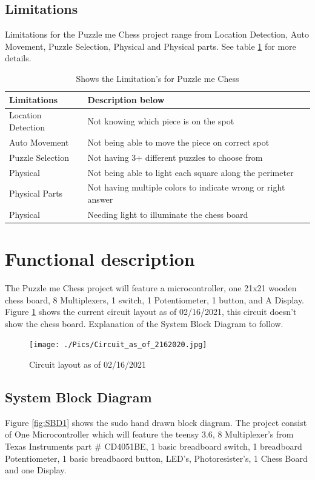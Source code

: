 \documentclass[11pt]{article}
\begin{document}
 
\subsection{Limitations}
Limitations for the Puzzle me Chess project range from Location Detection, Auto Movement, Puzzle Selection, Physical and Physical parts. See table \ref{tab:limitations} for more details.

\begin{table}
\begin{center}
    \begin{tabular}{| l | l |}
    \hline
    Limitations  & Description below\\ \hline
    Location Detection & Not knowing which piece is on the spot \\ \hline
    Auto Movement & Not being able to move the piece on correct spot \\ \hline 
    Puzzle Selection & Not having 3+ different puzzles to choose from  \\ \hline
    Physical & Not being able to light each square along the perimeter  \\ \hline
    Physical Parts & Not having multiple colors to indicate wrong or right answer \\ \hline
    Physical & Needing light to illuminate  the chess board \\ \hline
    \end{tabular}
    \caption{Shows the Limitation's for Puzzle me Chess}
	\label{tab:limitations}
\end{center}
\end{table}

\section{Functional description}
The Puzzle me Chess project will feature a microcontroller, one 21x21 wooden chess board, 8 Multiplexers, 1 switch, 1 Potentiometer, 1 button, and A Display. Figure \ref{fig:Circuit} shows  the current circuit layout as of 02/16/2021, this circuit doesn't show the chess board. Explanation of the System Block Diagram to follow.

\begin{figure}
  \texttt{[image: ./Pics/Circuit\_as\_of\_2162020.jpg]}
  \caption{Circuit layout as of 02/16/2021}
  \label{fig:Circuit}
\end{figure}

\subsection{System Block Diagram}
Figure \ref{fig:SBD1} shows the sudo hand drawn block diagram. The project consist of One Microcontroller which will feature the teensy 3.6, 8 Multiplexer's from Texas Instruments part \# CD4051BE, 1 basic breadboard switch, 1 breadboard Potentiometer, 1 basic breadbaord button, LED's, Photoresister's, 1 Chess Board and one Display. 
\\
\end{document}

